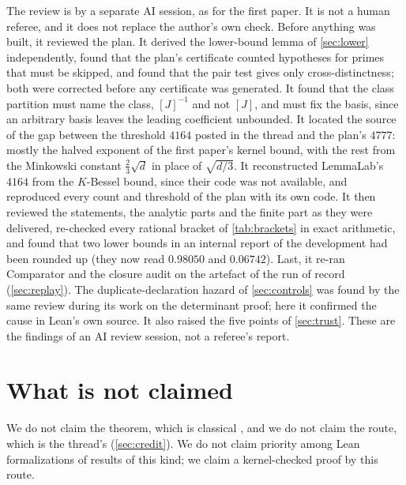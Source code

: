 \documentclass[11pt]{article}
\theoremstyle{definition}
\begin{document}
{The review is by a separate AI session, as for the first paper. It is not a human referee, and it does not replace the author's own check. Before anything was built, it reviewed the plan. It derived the lower-bound lemma of \cref{sec:lower} independently, found that the plan's certificate counted hypotheses for primes that must be skipped, and found that the pair test gives only cross-distinctness; both were corrected before any certificate was generated. It found that the class partition must name the class, $[J]^{-1}$ and not $[J]$, and must fix the basis, since an arbitrary basis leaves the leading coefficient unbounded. It located the source of the gap between the threshold $4164$ posted in the thread and the plan's $4777$: mostly the halved exponent of the first paper's kernel bound, with the rest from the Minkowski constant $\frac23\sqrt d$ in place of $\sqrt{d/3}$. It reconstructed LemmaLab's $4164$ from the $K$-Bessel bound, since their code was not available, and reproduced every count and threshold of the plan with its own code. It then reviewed the statements, the analytic parts and the finite part as they were delivered, re-checked every rational bracket of \cref{tab:brackets} in exact arithmetic, and found that two lower bounds in an internal report of the development had been rounded up (they now read $0.98050$ and $0.06742$). Last, it re-ran Comparator and the closure audit on the artefact of the run of record (\cref{sec:replay}). The duplicate-declaration hazard of \cref{sec:controls} was found by the same review during its work on the determinant proof; here it confirmed the cause in Lean's own source. It also raised the five points of \cref{sec:trust}. These are the findings of an AI review session, not a referee's report.

\section{What is not claimed}\label{sec:notclaimed}

We do not claim the theorem, which is classical \cite{Baker1971,Stark1971,MontgomeryWeinberger1974,Stark1975}, and we do not claim the route, which is the thread's (\cref{sec:credit}). We do not claim priority among Lean formalizations of results of this kind; we claim a kernel-checked proof by this route.

}
\end{document}
